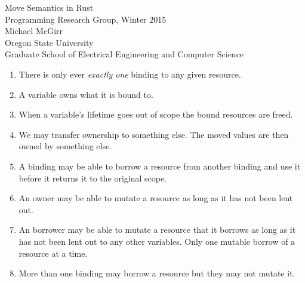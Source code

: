 \documentclass[10pt]{article}
\begin{document}
\vspace{2.0cm}

\begin{center}
    {\huge Move Semantics in Rust} 
    \vspace{0.1in} \\
    {\large Programming Research Group, Winter 2015} 
    \vspace{0.1in} \\
    {\large Michael McGirr} 
    \vspace{0.1in} \\
    {\large Oregon State University} 
    \vspace{0.1in} \\
    {\large Graduate School of Electrical Engineering and Computer Science}  
\end{center}

\vspace{1.0cm}

\begin{enumerate}
    \item There is only ever \textit{exactly one} binding to any given resource.

    \item A variable owns what it is bound to.

    \item When a variable's lifetime goes out of scope the bound resources are freed.

    \item We may transfer ownership to something else. The moved values are then
          owned by something else.

    \item A binding may be able to borrow a resource from another binding and
          use it before it returns it to the original scope.

    \item An owner may be able to mutate a resource as long as
          it has not been lent out.

    \item An borrower may be able to mutate a resource that it borrows as long as
      it has not been lent out to any other variables. Only one mutable borrow of
      a resource at a time.

    \item More than one binding may borrow a resource but they may not mutate it.


\end{enumerate}
\end{document}
